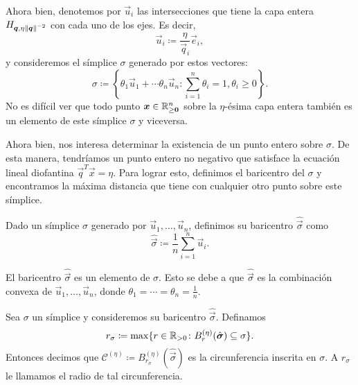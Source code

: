 Ahora bien, denotemos por $\vec{u}_i$ las intersecciones que tiene la capa entera $H_{\boldsymbol{q},
\eta\left\lVert \boldsymbol{q} \right\rVert^{-2}}$ con cada uno de los ejes. Es decir,
\begin{equation*}
	\vec{u}_i \coloneq \frac{\eta}{\vec{q}_i}\vec{e}_i,
\end{equation*}
y consideremos el símplice $\sigma$ generado por estos vectores:
\begin{equation*}
	\sigma \coloneq \left\lbrace \theta_1\vec{u}_1 + \cdots \theta_n\vec{u}_n \colon
		\sum_{i=1}^{n}\theta_i = 1, \theta_i \geq 0 \right\rbrace.
\end{equation*}
No es difícil ver que todo punto $\boldsymbol{x} \in \mathbb{R}^n_{\geq \boldsymbol{0}}$ sobre la $\eta$-ésima capa entera
también es un elemento de este símplice $\sigma$ y viceversa.

Ahora bien, nos interesa determinar la existencia de un punto entero sobre $\sigma$. De esta manera,
tendríamos un punto entero no negativo que satisface la ecuación lineal diofantina
$\vec{q}^T\vec{x} = \eta$. Para lograr esto, definimos el baricentro del $\sigma$ y
encontramos la máxima distancia que tiene con cualquier otro punto sobre este símplice.

\begin{definition}
	Dado un símplice $\sigma$ generado por $\vec{u}_1, \ldots, \vec{u}_n$, definimos su baricentro
	$\hat{\vec{\sigma}}$ como
	\begin{equation*}
		\hat{\vec{\sigma}} \coloneq \frac{1}{n} \sum_{i=1}^{n}\vec{u}_i.
	\end{equation*}
\end{definition}
\begin{observation}
	El baricentro $\hat{\vec{\sigma}}$ es un elemento de $\sigma$. Esto se debe a que $\hat{\vec{\sigma}}$ es la
	combinación convexa de $\vec{u}_1, \ldots, \vec{u}_n$, donde $\theta_1 = \cdots = \theta_n =
	\frac{1}{n}$.
\end{observation}

\begin{definition}
	Sea $\sigma$ un símplice y consideremos su baricentro $\hat{\vec{\sigma}}$. Definamos
	\begin{equation*}
		r_\sigma \coloneq \max \lbrace r \in \mathbb{R}_{>0} \colon B_r^{(\eta)}(\hat{\boldsymbol{\sigma}})
		\subseteq \sigma \rbrace.
	\end{equation*}
	Entonces decimos que $\mathcal{C}^{(\eta)} \coloneq
	B_{r_\sigma}^{(\eta)}(\hat{\vec{\sigma}})$ es la circunferencia inscrita en $\sigma$. A
	$r_\sigma$ le llamamos el radio de tal circunferencia.
\end{definition}

